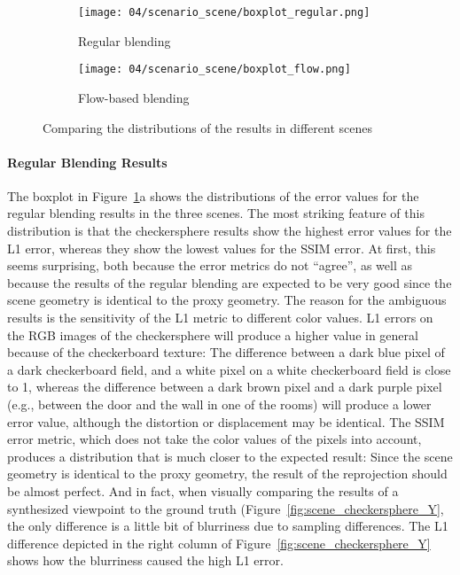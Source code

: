 \begin{figure}
\centering
    \hfill
    \begin{subfigure}[b]{0.49\textwidth}
            \centering
            \texttt{[image: 04/scenario\_scene/boxplot\_regular.png]}
            \caption{Regular blending}
    \end{subfigure}
    \hfill
    \begin{subfigure}[b]{0.49\textwidth}
            \centering
            \texttt{[image: 04/scenario\_scene/boxplot\_flow.png]}
            \caption{Flow-based blending}
    \end{subfigure}
    \hfill
  \caption{Comparing the distributions of the results in different scenes}
  \label{fig:scene_boxplot_split}
\end{figure}

\paragraph{Regular Blending Results}
The boxplot in Figure~\ref{fig:scene_boxplot_split}a shows the distributions of the error values for the regular blending results in the three scenes. The most striking feature of this distribution is that the checkersphere results show the highest error values for the L1 error, whereas they show the lowest values for the SSIM error. At first, this seems surprising, both because the error metrics do not ``agree'', as well as because the results of the regular blending are expected to be very good since the scene geometry is identical to the proxy geometry. The reason for the ambiguous results is the sensitivity of the L1 metric to different color values. L1 errors on the RGB images of the checkersphere will produce a higher value in general because of the checkerboard texture:
The difference between a dark blue pixel of a dark checkerboard field, and a white pixel on a white checkerboard field is close to 1, whereas the difference between a dark brown pixel and a dark purple pixel (e.g., between the door and the wall in one of the rooms) will produce a lower error value, although the distortion or displacement may be identical. The SSIM error metric, which does not take the color values of the pixels into account, produces a distribution that is much closer to the expected result: Since the scene geometry is identical to the proxy geometry, the result of the reprojection should be almost perfect. And in fact, when visually comparing the results of a synthesized viewpoint to the ground truth (Figure~\ref{fig:scene_checkersphere_Y}, the only difference is a little bit of blurriness due to sampling differences. The L1 difference depicted in the right column of Figure~\ref{fig:scene_checkersphere_Y} shows how the blurriness caused the high L1 error.

